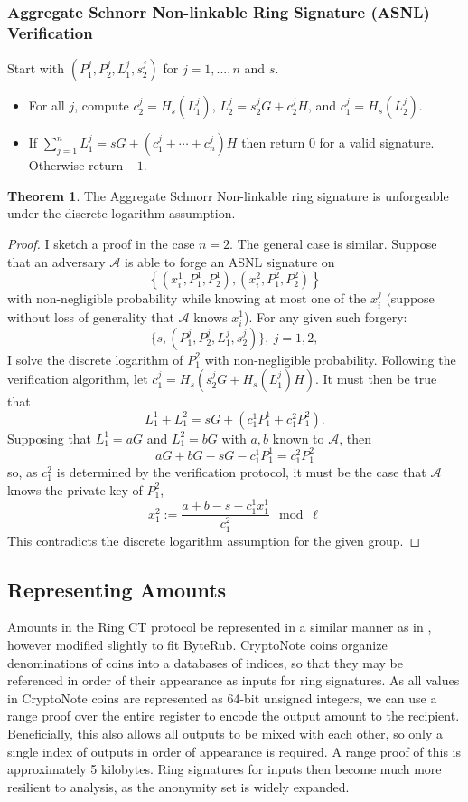 \documentclass[12pt,english]{mrl}
\theoremstyle{definition}
\newtheorem{thm}[lem]{Theorem}
\numberwithin{equation}{section}
\numberwithin{figure}{section}
\numberwithin{equation}{section}
\numberwithin{equation}{section}
\numberwithin{figure}{section}
\begin{document}
\subsubsection{ Aggregate Schnorr Non-linkable Ring Signature (ASNL) Verification}
Start with $(P_1^j, P_2^j, L_1^j, s_2^j)$ for $j=1,...,n$ and $s$. 
\begin{itemize}
 \item For all $j$, compute $c_2^j = H_s (L_1^j)$, $L_2^j = s_2^j G + c_2^j H$, and $c_1^j = H_s(L_2^j)$. 
 \item If $\sum_{j=1}^n L_1^j = s G + (c_1^j + \cdots + c_n^j) H$ then return $0$ for a valid signature.  Otherwise return $-1$. 
\end{itemize}
 \begin{thm}
 The Aggregate Schnorr Non-linkable ring signature is unforgeable under the discrete logarithm assumption.  
 \end{thm}
\begin{proof}
 I sketch a proof in the case $n=2$. The general case is similar. Suppose that an adversary $\mathcal{A}$ is able to forge an ASNL signature on 
\[
  \left\{ (x_i^1, P_1^1, P_2^1), (x_i^2, P_1^2, P_2^2) \right\}
 \]
 with non-negligible probability while knowing at most one of the $x_i^j$ (suppose without loss of generality that $\mathcal{A}$ knows $x_i^1$). For any given such forgery:
 \[
  \{s,(P_1^j, P_2^j, L_1^j, s_2^j)\},\ j=1,2,
 \]
I solve the discrete logarithm of $P_1^2$ with non-negligible probability. Following the verification algorithm, let $c_1^j = H_s\left(s_2^j G + H_s(L_1^j)H\right)$. It must then be true that 
\[
 L_1^1 + L_1^2 = sG + \left(c_1^1 P_1^1 + c_1^2 P_1^2\right).
\]
Supposing that $L_1^1 = a G$ and $L_1^2 = bG$ with $a,b$ known to $\mathcal{A}$, then 
\[ 
 aG + bG - sG - c_1^1 P_1^1 = c_1^2 P_1^2
\]
so, as $c_1^2$ is determined by the verification protocol, it must be the case that $\mathcal{A}$ knows the private key of $P_1^2$, 
\[
 x_1^2 := \frac{a+b-s-c_1^1 x_1^1}{c_1^2} \mod \ell
\]
 This contradicts the discrete logarithm assumption for the given group. 
\end{proof}
\subsection{Representing Amounts }
Amounts in the Ring CT protocol be represented in a similar manner as in \cite{GM}, however modified slightly to fit ByteRub.
CryptoNote coins organize denominations of coins into a databases of indices, so that they may be referenced in order of their appearance as inputs for ring signatures. As all values in CryptoNote coins are represented as 64-bit unsigned integers, we can use a range proof over the entire register to encode the output amount to the recipient. Beneficially, this also allows all outputs to be mixed with each other, so only a single index of outputs in order of appearance is required. A range proof of this is approximately 5 kilobytes. Ring signatures for inputs then become much more resilient to analysis, as the anonymity set is widely expanded.
\end{document}
